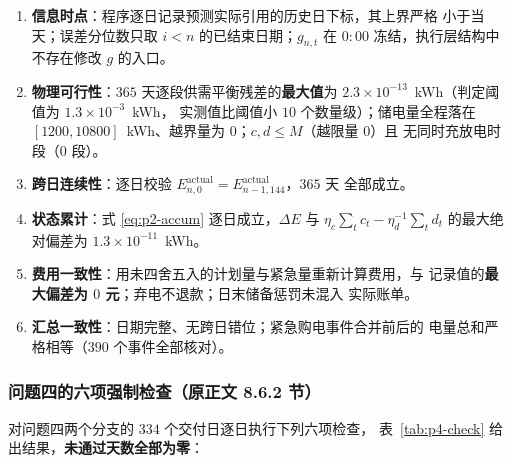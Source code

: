 \begin{enumerate}
  \item \textbf{信息时点}：程序逐日记录预测实际引用的历史日下标，其上界严格
        小于当天；误差分位数只取 $i<n$ 的已结束日期；$g_{n,t}$ 在 $0{:}00$
        冻结，执行层结构中不存在修改 $g$ 的入口。
  \item \textbf{物理可行性}：$365$ 天逐段供需平衡残差的\textbf{最大值}为
        $2.3\times10^{-13}$~kWh（判定阈值为 $1.3\times10^{-3}$~kWh，
        实测值比阈值小 $10$ 个数量级）；储电量全程落在
        $[1200,10800]$~kWh、越界量为 $0$；$c,d\le M$（越限量 $0$）且
        无同时充放电时段（$0$ 段）。
  \item \textbf{跨日连续性}：逐日校验
        $E_{n,0}^{\mathrm{actual}}=E_{n-1,144}^{\mathrm{actual}}$，$365$ 天
        全部成立。
  \item \textbf{状态累计}：式 \eqref{eq:p2-accum} 逐日成立，$\Delta E$ 与
        $\eta_c\sum_t c_t-\eta_d^{-1}\sum_t d_t$ 的最大绝对偏差为
        $1.3\times10^{-11}$~kWh。
  \item \textbf{费用一致性}：用未四舍五入的计划量与紧急量重新计算费用，与
        记录值的\textbf{最大偏差为 $0$ 元}；弃电不退款；日末储备惩罚未混入
        实际账单。
  \item \textbf{汇总一致性}：日期完整、无跨日错位；紧急购电事件合并前后的
        电量总和严格相等（$390$ 个事件全部核对）。
\end{enumerate}


\subsubsection{问题四的六项强制检查（原正文 8.6.2 节）}

对问题四两个分支的 $334$ 个交付日逐日执行下列六项检查，
表~\ref{tab:p4-check} 给出结果，\textbf{未通过天数全部为零}：

